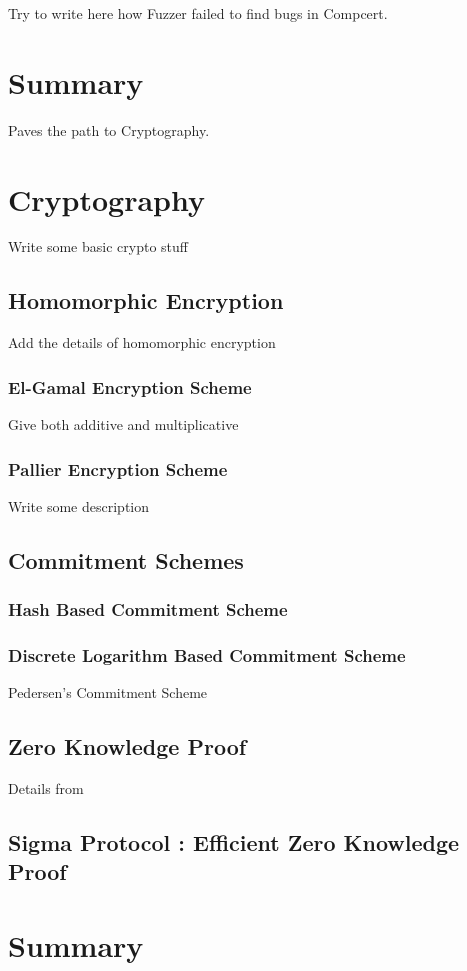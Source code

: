   Try to write here how Fuzzer failed to find bugs in Compcert. 
  
\section{Summary} 
  Paves the path to Cryptography. 
    
\section{Cryptography}
    Write some basic crypto stuff
    
    \subsection{Homomorphic Encryption}
     Add the details of 
     homomorphic encryption 
     \subsubsection{El-Gamal Encryption Scheme}
        Give both additive and multiplicative
     \subsubsection{Pallier Encryption Scheme}
        Write some description
     \subsection{Commitment Schemes}   
        \subsubsection{Hash Based Commitment Scheme}
        \subsubsection{Discrete Logarithm Based Commitment Scheme}
         Pedersen's Commitment Scheme
     \subsection{Zero Knowledge Proof}
  		Details from 
  	 \subsection{Sigma Protocol : Efficient Zero Knowledge Proof}
  



\section{Summary}











